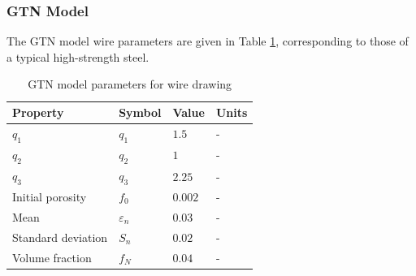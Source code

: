 \documentclass[sn-mathphys,Numbered]{sn-jnl}%
\begin{document}
\subsubsection{GTN Model}
The GTN model wire parameters are given in Table \ref{tab:GTN_wire_draw_mat}, corresponding to those of a typical high-strength steel.
\begin{table}[htb]
	\centering
		\begin{tabular}{llll} \hline
		Property & Symbol & Value & Units  \\ \hline 
		$q_1$ & $q_1$ & $1.5$ & - \\
		$q_2$ & $q_2$ & $1$ & - \\
		$q_3$ & $q_3$ & $2.25$ & - \\
		Initial porosity & $f_0$ & $0.002$ & -  \\
		Mean & $\varepsilon_n$ & $0.03$ & -  \\
		Standard deviation & $S_n$ & $0.02$ & - \\
		Volume fraction & $f_N$ & $0.04$ & - \\
		\hline
		\end{tabular}
	\caption{GTN model parameters for wire drawing}
	\label{tab:GTN_wire_draw_mat}
\end{table}
\end{document}
